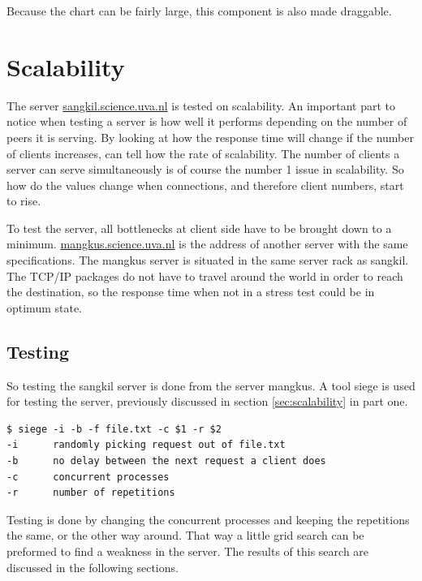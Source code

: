 Because the chart can be fairly large, this component is also made draggable.
\section{Scalability}
The server \url{sangkil.science.uva.nl} is tested on scalability. An important part to notice when testing a server is how well it performs depending on the number of peers it is serving. By looking at how the response time will change if the number of clients increases, can tell how the rate of scalability. The number of clients a server can serve simultaneously is of course the number 1 issue in scalability. So how do the values change when connections, and therefore client numbers, start to rise.

To test the server, all bottlenecks at client side have to be brought down to a minimum. \url{mangkus.science.uva.nl} is the address of another server with the same specifications. The mangkus server is situated in the same server rack as sangkil. The TCP/IP packages do not have to travel around the world in order to reach the destination, so the response time when not in a stress test could be in optimum state. 

\subsection{Testing}
So testing the sangkil server is done from the server mangkus. A tool siege is used for testing the server, previously discussed in section \ref{sec:scalability} in part one.
\begin{lstlisting}
$ siege -i -b -f file.txt -c $1 -r $2
-i		randomly picking request out of file.txt
-b		no delay between the next request a client does
-c		concurrent processes
-r		number of repetitions
\end{lstlisting}

Testing is done by changing the concurrent processes and keeping the repetitions the same, or the other way around. That way a little grid search can be preformed to find a weakness in the server. The results of this search are discussed in the following sections. 

